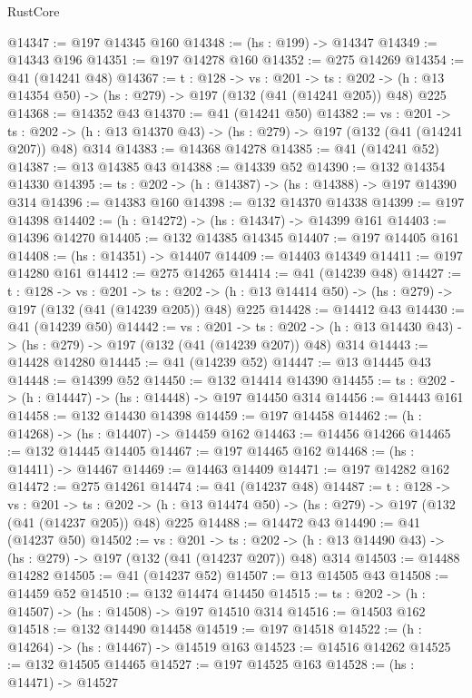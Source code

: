 \begin{lexlean}{RustCore}
\begin{coremodule}
@14347 := @197 @14345 @160
@14348 := (hs : @199) -> @14347
@14349 := @14343 @196
@14351 := @197 @14278 @160
@14352 := @275 @14269
@14354 := @41 (@14241 @48)
@14367 := {t : @128} ->
  {vs : @201} ->
  {ts : @202} -> (h : @13 @14354 @50) -> (hs : @279) -> @197 (@132 (@41 (@14241 @205)) @48) @225
@14368 := @14352 @43
@14370 := @41 (@14241 @50)
@14382 := {vs : @201} ->
  {ts : @202} -> (h : @13 @14370 @43) -> (hs : @279) -> @197 (@132 (@41 (@14241 @207)) @48) @314
@14383 := @14368 @14278
@14385 := @41 (@14241 @52)
@14387 := @13 @14385 @43
@14388 := @14339 @52
@14390 := @132 @14354 @14330
@14395 := {ts : @202} -> (h : @14387) -> (hs : @14388) -> @197 @14390 @314
@14396 := @14383 @160
@14398 := @132 @14370 @14338
@14399 := @197 @14398
@14402 := (h : @14272) -> (hs : @14347) -> @14399 @161
@14403 := @14396 @14270
@14405 := @132 @14385 @14345
@14407 := @197 @14405 @161
@14408 := (hs : @14351) -> @14407
@14409 := @14403 @14349
@14411 := @197 @14280 @161
@14412 := @275 @14265
@14414 := @41 (@14239 @48)
@14427 := {t : @128} ->
  {vs : @201} ->
  {ts : @202} -> (h : @13 @14414 @50) -> (hs : @279) -> @197 (@132 (@41 (@14239 @205)) @48) @225
@14428 := @14412 @43
@14430 := @41 (@14239 @50)
@14442 := {vs : @201} ->
  {ts : @202} -> (h : @13 @14430 @43) -> (hs : @279) -> @197 (@132 (@41 (@14239 @207)) @48) @314
@14443 := @14428 @14280
@14445 := @41 (@14239 @52)
@14447 := @13 @14445 @43
@14448 := @14399 @52
@14450 := @132 @14414 @14390
@14455 := {ts : @202} -> (h : @14447) -> (hs : @14448) -> @197 @14450 @314
@14456 := @14443 @161
@14458 := @132 @14430 @14398
@14459 := @197 @14458
@14462 := (h : @14268) -> (hs : @14407) -> @14459 @162
@14463 := @14456 @14266
@14465 := @132 @14445 @14405
@14467 := @197 @14465 @162
@14468 := (hs : @14411) -> @14467
@14469 := @14463 @14409
@14471 := @197 @14282 @162
@14472 := @275 @14261
@14474 := @41 (@14237 @48)
@14487 := {t : @128} ->
  {vs : @201} ->
  {ts : @202} -> (h : @13 @14474 @50) -> (hs : @279) -> @197 (@132 (@41 (@14237 @205)) @48) @225
@14488 := @14472 @43
@14490 := @41 (@14237 @50)
@14502 := {vs : @201} ->
  {ts : @202} -> (h : @13 @14490 @43) -> (hs : @279) -> @197 (@132 (@41 (@14237 @207)) @48) @314
@14503 := @14488 @14282
@14505 := @41 (@14237 @52)
@14507 := @13 @14505 @43
@14508 := @14459 @52
@14510 := @132 @14474 @14450
@14515 := {ts : @202} -> (h : @14507) -> (hs : @14508) -> @197 @14510 @314
@14516 := @14503 @162
@14518 := @132 @14490 @14458
@14519 := @197 @14518
@14522 := (h : @14264) -> (hs : @14467) -> @14519 @163
@14523 := @14516 @14262
@14525 := @132 @14505 @14465
@14527 := @197 @14525 @163
@14528 := (hs : @14471) -> @14527

\end{coremodule}
\end{lexlean}
